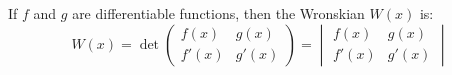 \documentclass[crop=false,class=article,oneside]{standalone}
\begin{document}
        \begin{definition}
            If $f$ and $g$ are differentiable functions,
            then the Wronskian $W(x)$ is:
            \begin{equation*}
                W(x)=
                \det
                \begin{pmatrix}
                    f(x)&g(x)\\
                    f'(x)&g'(x)
                \end{pmatrix}
                =
                \begin{vmatrix}
                    f(x)&g(x)\\
                    f'(x)&g'(x)
                \end{vmatrix}
            \end{equation*}
        \end{definition}
\end{document}
